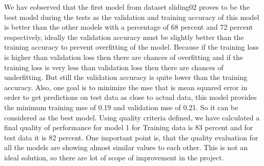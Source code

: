 \begin{table}
\centering
{}
\caption{ Quality Model for models with different hidden units for dataset sliding03}
\label{table:qualitymodelregression2}
\end{table}

We hav eobserved that the first model from dataset sliding02 proves to be the best model during the tests as the  validation and training accuracy of this model is better than the other models with a percentage of 68 percent and 72 percent respectively, ideally the validation accuracy must be slightly better than the training accuracy to prevent overfitting of the model. Because if the training loss is higher than validation loss then there are chances of overfitting and if the training loss is very less than validation loss then there are chances of underfitting. But still the validation accuracy is quite lower than the training accuracy.\newline
Also, one goal is to minimize the mse that is mean squared error in order to get predictions on test data as close to actual data, this model provides the minimum training mse of 0.19 and validation mse of 0.21. So it can be considered as the best model.\newline
Using quality criteria defined, we have calculated a final quality of performance for model 1 for Training data is 83 percent and for test data it is 82 percent. One important point is, that the quality evaluation for all the models are showing almost similar values to each other. This is not an ideal solution, so there are lot of scope of improvement in the project.\newline

